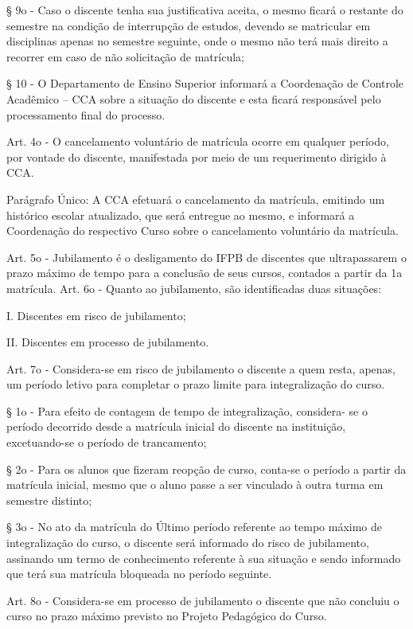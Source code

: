 § 9o - Caso o discente tenha sua justificativa aceita, o mesmo ficará o restante do semestre na condição de interrupção de estudos, devendo se matricular em disciplinas apenas no semestre seguinte, onde o mesmo não terá mais direito a recorrer em caso de não solicitação de matrícula;

§ 10 - O Departamento de Ensino Superior informará a Coordenação de Controle Acadêmico – CCA sobre a situação do discente e esta ficará responsável pelo processamento final do processo.

Art. 4o - O cancelamento voluntário de matrícula ocorre em qualquer período, por vontade do discente, manifestada por meio de um requerimento dirigido à CCA.

Parágrafo Único: A CCA efetuará o cancelamento da matrícula, emitindo um histórico escolar atualizado, que será entregue ao mesmo, e informará a Coordenação do respectivo Curso sobre o cancelamento voluntário da matrícula.

Art. 5o - Jubilamento é o desligamento do IFPB de discentes que ultrapassarem o prazo máximo de tempo para a conclusão de seus cursos, contados a partir da 1a matrícula.
Art. 6o - Quanto ao jubilamento, são identificadas duas situações: 

I. Discentes em risco de jubilamento;

II. Discentes em processo de jubilamento.

Art. 7o - Considera-se em risco de jubilamento o discente a quem resta, apenas, um período letivo para completar o prazo limite para integralização do curso.

§ 1o - Para efeito de contagem de tempo de integralização, considera- se o período decorrido desde a matrícula inicial do discente na instituição, excetuando-se o período de trancamento;

§ 2o - Para os alunos que fizeram reopção de curso, conta-se o período a partir da matrícula inicial, mesmo que o aluno passe a ser vinculado à outra turma em semestre distinto;

§ 3o - No ato da matrícula do Último período referente ao tempo máximo de integralização do curso, o discente será informado do risco de jubilamento, assinando um termo de conhecimento referente à sua situação e sendo informado que terá sua matrícula bloqueada no período seguinte.

Art. 8o - Considera-se em processo de jubilamento o discente que não concluiu o curso no prazo máximo previsto no Projeto Pedagógico do Curso.

